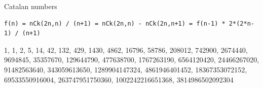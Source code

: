 Catalan numbers
\begin{verbatim}
f(n) = nCk(2n,n) / (n+1) = nCk(2n,n) - nCk(2n,n+1) = f(n-1) * 2*(2*n-1) / (n+1)
\end{verbatim}
1, 1, 2, 5, 14, 42, 132, 429, 1430, 4862, 16796, 58786, 208012, 742900, 2674440, 9694845, 35357670, 129644790, 477638700, 1767263190, 6564120420, 24466267020, 91482563640, 343059613650, 1289904147324, 4861946401452, 18367353072152, 69533550916004, 263747951750360, 1002242216651368, 3814986502092304
